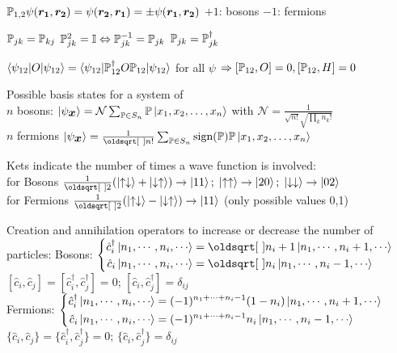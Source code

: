 \begin{squishlist}
    \item $\P_{1,2} \psi(\vec{r_1}, \vec{r_2}) = \psi(\vec{r_2}, \vec{r_1}) = \pm \psi(\vec{r_1}, \vec{r_2})$ \quad $+1$: bosons \quad $-1$: fermions
    \item $\P_{jk} = \P_{kj}$ \squishsep $\P_{jk}^2 = \id \Leftrightarrow \P_{jk}^{-1}=\P_{jk}$ \squishsep $\P_{jk} = \P_{jk}^{\dagger}$
    \item $\braket{\psi_{12}|O|\psi_{12}} = \braket{\psi_{12}|\P_{12}^{\dagger}O\P_{12}|\psi_{12}}$ for all $\psi$ $\Rightarrow [\P_{12},O] = 0, [\P_{12},H] = 0$
    \item Possible basis states for a system of \\ $n$ bosons: $\ket{\psi_{\vec{x}}} = \mathcal{N} \sum_{\P \in S_n} \P\ket{x_1,x_2, \ldots, x_n}$ with $\mathcal{N} = \frac{1}{\sqrt{n!}\sqrt{\prod_k n_k !}}$ \\
    $n$ fermions $\ket{\psi_{\vec{x}}} = \frac{1}{\sqrt{n!}} \sum_{\P \in S_n} \text{sign}(\P) \P \ket{x_1, x_2, \ldots, x_n}$
\end{squishlist}

\begin{squishlist}
    \item Kets indicate the number of times a wave function is involved:\\
    for Bosons $\frac{1}{\sqrt{2}} ( \ket{\uparrow \downarrow} + \ket{\downarrow \uparrow}) \rightarrow \ket{11};\; \ket{\uparrow \uparrow} \rightarrow \ket{20};\; \ket{\downarrow \downarrow} \rightarrow \ket{02}$\\
    for Fermions $\frac{1}{\sqrt{2}} ( \ket{\uparrow \downarrow} - \ket{\downarrow \uparrow}) \rightarrow \ket{11}$ (only possible values 0,1)
    \item Creation and annihilation operators to increase or decrease the number of particles:
    Bosons:  $\left\{ \begin{aligned}
    \hat{c}_i^{\dagger} \ket{n_1, \cdots, n_i, \cdots} &= \sqrt{n_i + 1} \ket{n_1, \cdots, n_i +1, \cdots} \\
    \hat{c}_i \ket{n_1, \cdots, n_i, \cdots} &= \sqrt{n_i} \ket{n_1, \cdots, n_i -1, \cdots}
    \end{aligned}\right.$ \\
    $[\hat{c}_i, \hat{c}_j] = [\hat{c}_i^{\dagger}, \hat{c}_j^{\dagger}] = 0$; \qquad $[\hat{c}_i, \hat{c}_j^{\dagger}] = \delta_{ij}$ \\
    Fermions: $\left\{ \begin{aligned}
    \hat{c}_i^{\dagger} \ket{n_1, \cdots, n_i, \cdots} &= (-1)^{n_1+\cdots+n_i-1}(1-n_i) \ket{n_1, \cdots, n_i +1, \cdots} \\
    \hat{c}_i \ket{n_1, \cdots, n_i, \cdots} &= (-1)^{n_1+\cdots+n_i-1} n_i \ket{n_1, \cdots, n_i -1, \cdots}
    \end{aligned}\right.$ \\
    $\{\hat{c}_i, \hat{c}_j\} = \{\hat{c}_i^{\dagger}, \hat{c}_j^{\dagger}\} = 0$; \qquad $\{\hat{c}_i, \hat{c}_j^{\dagger}\} = \delta_{ij}$ 
\end{squishlist}


